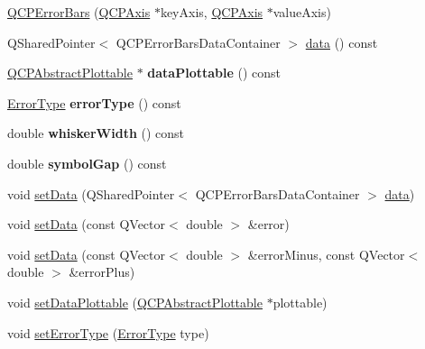 \begin{DoxyCompactItemize}
\item 
\hyperlink{classQCPErrorBars_a5cdcc33e5f173780c3d657e96216e5c1}{Q\+C\+P\+Error\+Bars} (\hyperlink{classQCPAxis}{Q\+C\+P\+Axis} $\ast$key\+Axis, \hyperlink{classQCPAxis}{Q\+C\+P\+Axis} $\ast$value\+Axis)
\item 
Q\+Shared\+Pointer$<$ Q\+C\+P\+Error\+Bars\+Data\+Container $>$ \hyperlink{classQCPErrorBars_aeebd1b14f4c3573565efafd514988813}{data} () const
\item 
\mbox{\label{classQCPErrorBars_ad7e5f1229db58d05bb3d8305d2504af8}} 
\hyperlink{classQCPAbstractPlottable}{Q\+C\+P\+Abstract\+Plottable} $\ast$ {\bfseries data\+Plottable} () const
\item 
\mbox{\label{classQCPErrorBars_a527e7df83c98709cef22a8447fee4f13}} 
\hyperlink{classQCPErrorBars_a95f0220f11a72648b96480a85ce26474}{Error\+Type} {\bfseries error\+Type} () const
\item 
\mbox{\label{classQCPErrorBars_ae5a292470366ec92b248753f83b8646e}} 
double {\bfseries whisker\+Width} () const
\item 
\mbox{\label{classQCPErrorBars_a2c969749fa0db565a42b80db9da5f388}} 
double {\bfseries symbol\+Gap} () const
\item 
void \hyperlink{classQCPErrorBars_a92b1980003255f5f7c05407a4d92aabc}{set\+Data} (Q\+Shared\+Pointer$<$ Q\+C\+P\+Error\+Bars\+Data\+Container $>$ \hyperlink{classQCPErrorBars_aeebd1b14f4c3573565efafd514988813}{data})
\item 
void \hyperlink{classQCPErrorBars_a2f33d68a7ec163b09017dce3d9d3abcc}{set\+Data} (const Q\+Vector$<$ double $>$ \&error)
\item 
void \hyperlink{classQCPErrorBars_aac0cf070b957c11177e91b02bcb433c8}{set\+Data} (const Q\+Vector$<$ double $>$ \&error\+Minus, const Q\+Vector$<$ double $>$ \&error\+Plus)
\item 
void \hyperlink{classQCPErrorBars_aabb42a964cfbf780cd1c79850c7cd989}{set\+Data\+Plottable} (\hyperlink{classQCPAbstractPlottable}{Q\+C\+P\+Abstract\+Plottable} $\ast$plottable)
\item 
void \hyperlink{classQCPErrorBars_af0af493d454a8f3a0908830160680d2b}{set\+Error\+Type} (\hyperlink{classQCPErrorBars_a95f0220f11a72648b96480a85ce26474}{Error\+Type} type)

\end{DoxyCompactItemize}
